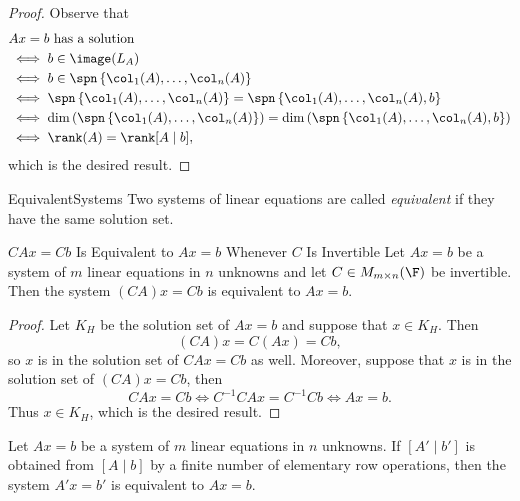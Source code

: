 \documentclass[linearalgebraI]{subfiles}
\begin{document}
    \begin{proof}
        Observe that
        \begin{align*}
            & Ax=b\text{ has a solution} \\ 
            & \iff b\in \image(L_A) \\
            & \iff b\in \spn \left\lbrace \col_1(A), \ldots, \col_n(A) \right\rbrace \\
            & \iff \spn \left\lbrace \col_1(A), \ldots, \col_n(A) \right\rbrace = \spn \left\lbrace \col_1(A), \ldots, \col_n(A), b \right\rbrace \\
            & \iff \dim \left( \spn \left\lbrace \col_1(A), \ldots, \col_n(A) \right\rbrace \right) = \dim \left( \spn \left\lbrace \col_1(A), \ldots, \col_n(A), b \right\rbrace \right) \\
            & \iff \rank(A) = \rank [A\mid b],
        \end{align*}
        which is the desired result.
    \end{proof}

    \begin{definition}{Equivalent}{Systems}
        Two systems of linear equations are called \emph{equivalent} if they have the same solution set.
    \end{definition}

    \begin{prop}{$CAx=Cb$ Is Equivalent to $Ax=b$ Whenever $C$ Is Invertible}
            Let $Ax=b$ be a system of $m$ linear equations in $n$ unknowns and let $C\in M_{m\times n}(\F)$ be invertible. Then the system $(CA)x = Cb$ is equivalent to $Ax = b$.
    \end{prop}

    \begin{proof}
        Let $K_H$ be the solution set of $Ax=b$ and suppose that $x\in K_H$. Then
        \begin{equation*}
            (CA)x = C(Ax) = Cb,
        \end{equation*}
        so $x$ is in the solution set of $CAx=Cb$ as well. Moreover, suppose that $x$ is in the solution set of $(CA)x = Cb$, then
        \begin{equation*}
            CAx = Cb \iff C^{-1}CAx = C^{-1}Cb \iff Ax = b.
        \end{equation*}
        Thus $x\in K_H$, which is the desired result.
    \end{proof}

    \begin{cor}{}
        Let $Ax=b$ be a system of $m$ linear equations in $n$ unknowns. If $[A'\mid b']$ is obtained from $[A\mid b]$ by a finite number of elementary row operations, then the system $A'x=b'$ is equivalent to $Ax=b$.
    \end{cor}	
\end{document}
